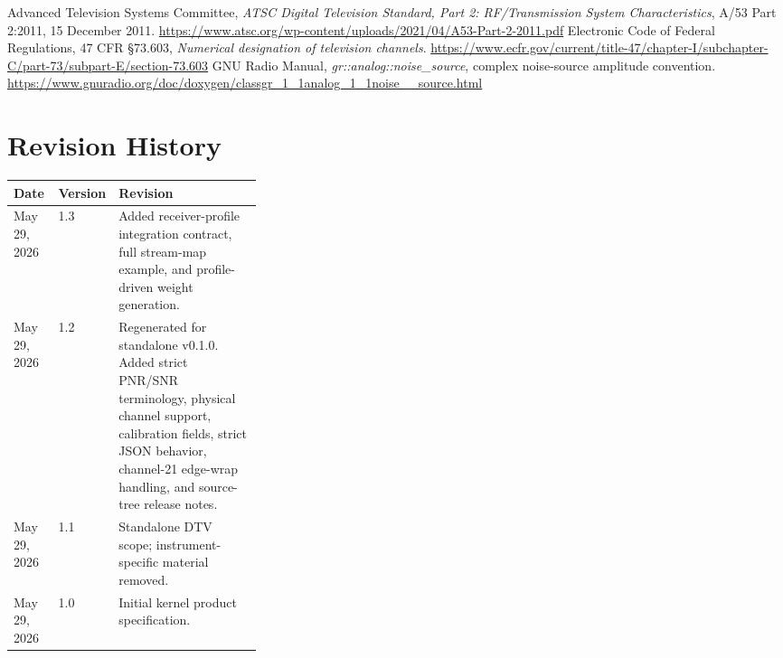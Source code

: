 \documentclass[10pt,letterpaper]{article}
\newcommand{\code}[1]{\texttt{\detokenize{#1}}}
\begin{document}
\begin{thebibliography}{9}
 Advanced Television Systems Committee, \emph{ATSC Digital Television Standard, Part 2: RF/Transmission System Characteristics}, A/53 Part 2:2011, 15 December 2011. \url{https://www.atsc.org/wp-content/uploads/2021/04/A53-Part-2-2011.pdf}
 Electronic Code of Federal Regulations, 47 CFR \S 73.603, \emph{Numerical designation of television channels}. \url{https://www.ecfr.gov/current/title-47/chapter-I/subchapter-C/part-73/subpart-E/section-73.603}
 GNU Radio Manual, \emph{gr::analog::noise\_source}, complex noise-source amplitude convention. \url{https://www.gnuradio.org/doc/doxygen/classgr_1_1analog_1_1noise__source.html}
\end{thebibliography}

\section{Revision History}
\begin{tabularx}{\linewidth}{|L{0.18\linewidth}|L{0.14\linewidth}|Y|}
\hline
\textbf{Date} & \textbf{Version} & \textbf{Revision}\\ \hline
May 29, 2026 & 1.3 & Added receiver-profile integration contract, full stream-map example, and profile-driven weight generation.\\ \hline
May 29, 2026 & 1.2 & Regenerated for standalone \code{pilot-proxy} v0.1.0.  Added strict PNR/SNR terminology, physical channel support, calibration fields, strict JSON behavior, channel-21 edge-wrap handling, and source-tree release notes.\\ \hline
May 29, 2026 & 1.1 & Standalone DTV scope; instrument-specific material removed.\\ \hline
May 29, 2026 & 1.0 & Initial kernel product specification.\\ \hline
\end{tabularx}
\end{document}

